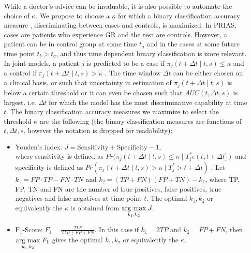 While a doctor's advice can be invaluable, it is also possible to automate the choice of $\kappa$. We propose to choose a $\kappa$ for which a binary classification accuracy measure \citep{lopez2014optimalcutpoints,sokolova2009systematic}, discriminating between cases and controls, is maximized. In PRIAS, cases are patients who experience GR and the rest are controls. However, a patient can be in control group at some time $t_a$ and in the cases at some future time point $t_b > t_a$, and thus time dependent binary classification is more relevant. In joint models, a patient $j$ is predicted to be a case if $\pi_j(t + \Delta t \mid t,s) \leq \kappa$ and a control if $\pi_j(t + \Delta t \mid t,s) > \kappa$ \citep{rizopoulosJMbayes}. The time window $\Delta t$ can be either chosen on a clinical basis, or such that uncertainty in estimation of $\pi_j(t + \Delta t \mid t,s)$ is below a certain threshold or it can even be chosen such that $AUC(t, \Delta t, s)$ \citep{rizopoulosJMbayes} is largest. i.e. $\Delta t$ for which the model has the most discriminative capability at time $t$. The binary classification accuracy measures we maximize to select the threshold $\kappa$ are the following (the binary classification measures are functions of $t, \Delta t, s$, however the notation is dropped for readability): 

\begin{itemize}

\item Youden's index: $J = \text{Sensitivity} + \text{Specificity}- 1$,\\
where sensitivity is defined as $Pr(\pi_j(t + \Delta t \mid t,s) \leq \kappa \mid T^*_j \epsilon (t, t + \Delta t])$ and specificity is defined as $Pr(\pi_j(t + \Delta t \mid t,s) > \kappa \mid T^*_j > t + \Delta t)$ \citep{rizopoulosJMbayes}. Let $k_1 = FP \cdot TP - FN \cdot TN$ and $k_2 = (TP+FN)(FP+TN) - k_1$, where TP, FP, TN and FN are the number of true positives, false positives, true negatives and false negatives at time point $t$. The optimal $k_1, k_2$ or equivalently the $\kappa$ is obtained from $\underset{k_1, k_2}{\operatorname{arg}\,\operatorname{max}}\; J$.

\item $\text{F}_1$-Score: $F_1 = \frac{2TP}{2TP + FP + FN}$. In this case if $k_1 = 2TP$ and $k_2 = FP + FN$, then $\underset{k_1, k_2}{\operatorname{arg}\,\operatorname{max}}\; F _1$ gives the optimal $k_1, k_2$ or equivalently the $\kappa$.
\end{itemize}

